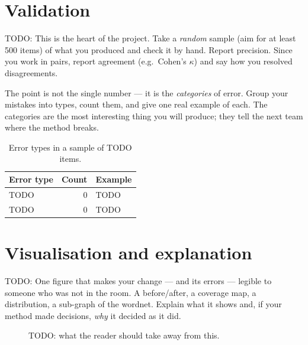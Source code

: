 \documentclass[a4paper,12pt]{article}
\begin{document}
\section{Validation}

TODO: This is the heart of the project.  Take a \emph{random} sample
(aim for at least 500 items) of what you produced and check it by hand.
Report precision.  Since you work in pairs, report agreement
(e.g.\ Cohen's $\kappa$) and say how you resolved disagreements.

The point is not the single number --- it is the \emph{categories} of
error.  Group your mistakes into types, count them, and give one real
example of each.  The categories are the most interesting thing you
will produce; they tell the next team where the method breaks.

\begin{table}[ht]
  \centering
  \begin{tabular}{lrl}
    \toprule
    Error type & Count & Example \\
    \midrule
    TODO & 0 & TODO \\
    TODO & 0 & TODO \\
    \bottomrule
  \end{tabular}
  \caption{Error types in a sample of TODO items.}
  \label{tab:errors}
\end{table}

\section{Visualisation and explanation}

TODO: One figure that makes your change --- and its errors --- legible
to someone who was not in the room.  A before/after, a coverage map, a
distribution, a sub-graph of the wordnet.  Explain what it shows and,
if your method made decisions, \emph{why} it decided as it did.

\begin{figure}[ht]
  \centering
  \caption{TODO: what the reader should take away from this.}
  \label{fig:main}
\end{figure}

\end{document}
